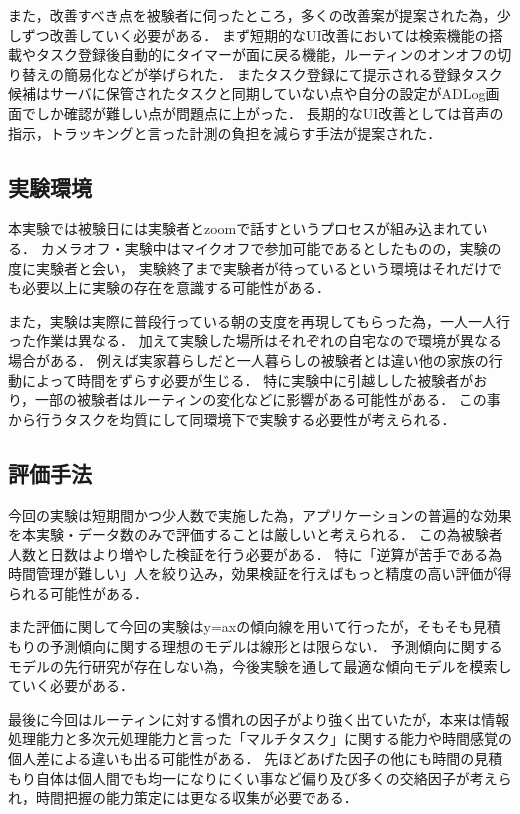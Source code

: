 \documentclass[submit,techrep,noauthor]{ipsj}
\begin{document}
また，改善すべき点を被験者に伺ったところ，多くの改善案が提案された為，少しずつ改善していく必要がある．
まず短期的なUI改善においては検索機能の搭載やタスク登録後自動的にタイマーが面に戻る機能，ルーティンのオンオフの切り替えの簡易化などが挙げられた．
またタスク登録にて提示される登録タスク候補はサーバに保管されたタスクと同期していない点や自分の設定がADLog画面でしか確認が難しい点が問題点に上がった．
長期的なUI改善としては音声の指示，トラッキングと言った計測の負担を減らす手法が提案された．

\subsection{実験環境}
本実験では被験日には実験者とzoomで話すというプロセスが組み込まれている．
カメラオフ・実験中はマイクオフで参加可能であるとしたものの，実験の度に実験者と会い，
実験終了まで実験者が待っているという環境はそれだけでも必要以上に実験の存在を意識する可能性がある．

また，実験は実際に普段行っている朝の支度を再現してもらった為，一人一人行った作業は異なる．
加えて実験した場所はそれぞれの自宅なので環境が異なる場合がある．
例えば実家暮らしだと一人暮らしの被験者とは違い他の家族の行動によって時間をずらす必要が生じる．
特に実験中に引越しした被験者がおり，一部の被験者はルーティンの変化などに影響がある可能性がある．
この事から行うタスクを均質にして同環境下で実験する必要性が考えられる．

\subsection{評価手法}
今回の実験は短期間かつ少人数で実施した為，アプリケーションの普遍的な効果を本実験・データ数のみで評価することは厳しいと考えられる．
この為被験者人数と日数はより増やした検証を行う必要がある．
特に「逆算が苦手である為時間管理が難しい」人を絞り込み，効果検証を行えばもっと精度の高い評価が得られる可能性がある．

また評価に関して今回の実験はy=axの傾向線を用いて行ったが，そもそも見積もりの予測傾向に関する理想のモデルは線形とは限らない．
予測傾向に関するモデルの先行研究が存在しない為，今後実験を通して最適な傾向モデルを模索していく必要がある．

最後に今回はルーティンに対する慣れの因子がより強く出ていたが，本来は情報処理能力と多次元処理能力と言った「マルチタスク」に関する能力\cite{multitask}や時間感覚\cite{Tayama2018}の個人差による違いも出る可能性がある．
先ほどあげた因子の他にも時間の見積もり自体は個人間でも均一になりにくい事など偏り及び多くの交絡因子が考えられ，時間把握の能力策定には更なる収集が必要である．
\end{document}
